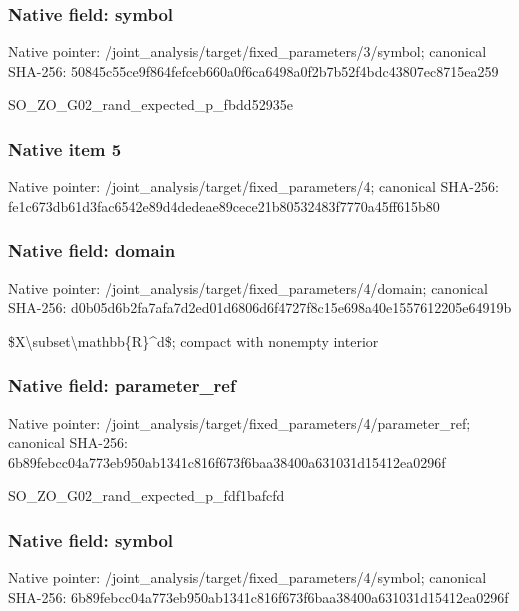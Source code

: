 \documentclass[10pt,a4paper]{article}
\begin{document}
\subsubsection{Native field: symbol}
Native pointer: /joint\_\allowbreak{}analysis/target/fixed\_\allowbreak{}parameters/3/symbol; canonical SHA-256: 50845c55ce9f864fefceb660a0f6ca6498a0f2b7b52f4bdc43807ec8715ea259

\begingroup\raggedright\sloppy SO\_\allowbreak{}ZO\_\allowbreak{}G02\_\allowbreak{}rand\_\allowbreak{}expected\_\allowbreak{}p\_\allowbreak{}fbdd52935e\par\endgroup

\subsubsection{Native item 5}
Native pointer: /joint\_\allowbreak{}analysis/target/fixed\_\allowbreak{}parameters/4; canonical SHA-256: fe1c673db61d3fac6542e89d4dedeae89cece21b80532483f7770a45ff615b80

\subsubsection{Native field: domain}
Native pointer: /joint\_\allowbreak{}analysis/target/fixed\_\allowbreak{}parameters/4/domain; canonical SHA-256: d0b05d6b2fa7afa7d2ed01d6806d6f4727f8c15e698a40e1557612205e64919b

\begingroup\raggedright\sloppy \$X\textbackslash{}subset\textbackslash{}mathbb\{R\}\textasciicircum{}d\$;\allowbreak{} compact with nonempty interior\par\endgroup

\subsubsection{Native field: parameter\_\allowbreak{}ref}
Native pointer: /joint\_\allowbreak{}analysis/target/fixed\_\allowbreak{}parameters/4/parameter\_\allowbreak{}ref; canonical SHA-256: 6b89febcc04a773eb950ab1341c816f673f6baa38400a631031d15412ea0296f

\begingroup\raggedright\sloppy SO\_\allowbreak{}ZO\_\allowbreak{}G02\_\allowbreak{}rand\_\allowbreak{}expected\_\allowbreak{}p\_\allowbreak{}fdf1bafcfd\par\endgroup

\subsubsection{Native field: symbol}
Native pointer: /joint\_\allowbreak{}analysis/target/fixed\_\allowbreak{}parameters/4/symbol; canonical SHA-256: 6b89febcc04a773eb950ab1341c816f673f6baa38400a631031d15412ea0296f
\end{document}
